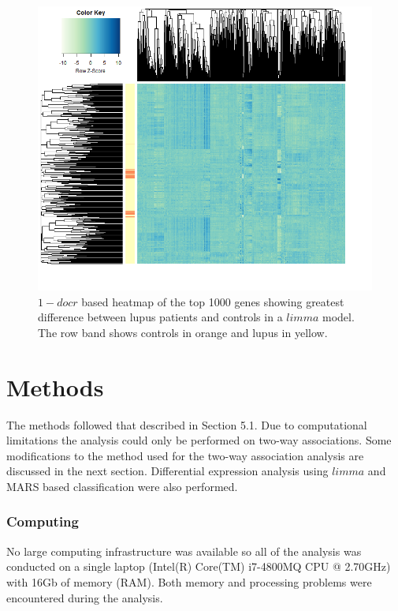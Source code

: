 \documentclass[a4paper, 12pt]{report}
\begin{document}
\begin{figure}[h]
\begin{centering}
\includegraphics[width=\textwidth]{bigHeatSafe}
\caption{$1-docr$ based heatmap of the top 1000 genes showing greatest difference between lupus patients and controls in a $limma$ model. The row band shows controls in orange and lupus in yellow.} 
\label{F:bigHeat}
\end{centering}
\end{figure}

\section{Methods}
The methods followed that described in Section 5.1. Due to computational limitations the analysis could only be performed on two-way associations. Some modifications to the method used for the two-way association analysis are discussed in the next section.  Differential expression analysis using $limma$ and MARS based classification were also performed.

\subsubsection{Computing}
No large computing infrastructure was available so all of the analysis was conducted on a single laptop (Intel(R) Core(TM) i7-4800MQ CPU @ 2.70GHz) with 16Gb of memory (RAM). Both memory and processing problems were encountered during the analysis.
\end{document}
